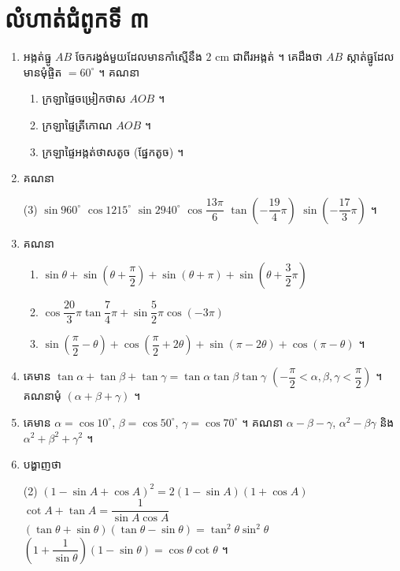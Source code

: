 \section*{លំហាត់ជំពូកទី ៣}
\begin{enumerate}[1]
  \item អង្កត់ធ្នូ $AB$ ចែករង្វង់មួយដែលមានកាំស្មើនឹង $2$ cm ជាពីរអង្កត់ ។ គេដឹងថា $AB$ ស្កាត់ធ្នូដែលមានមុំផ្ចិត $= 60^\circ$ ។ គណនា
  \begin{enumerate}[a]
    \item ក្រឡាផ្ទៃចម្រៀកថាស $AOB$ ។
    \item ក្រឡាផ្ទៃត្រីកោណ $AOB$ ។
    \item ក្រឡាផ្ទៃអង្កត់ថាសតូច (ផ្នែកតូច) ។
  \end{enumerate}
  \item គណនា
  \begin{tasks}(3)
    \task $\sin 960^\circ$
    \task $\cos 1215^\circ$
    \task $\sin 2940^\circ$
    \task $\cos\dfrac{13\pi}{6}$
    \task $\tan\left(-\dfrac{19}{4}\pi\right)$
    \task $\sin\left(-\dfrac{17}{3}\pi\right)$ ។
  \end{tasks}
  \item គណនា
  \begin{enumerate}[a]
    \item $\sin\theta + \sin\left(\theta + \dfrac{\pi}{2}\right) + \sin(\theta + \pi) + \sin\left(\theta + \dfrac{3}{2}\pi\right)$
    \item $\cos\dfrac{20}{3}\pi\tan\dfrac{7}{4}\pi + \sin\dfrac{5}{2}\pi\cos(-3\pi)$
    \item $\sin\left(\dfrac{\pi}{2} - \theta\right) + \cos\left(\dfrac{\pi}{2} + 2\theta\right) + \sin(\pi - 2\theta) + \cos(\pi - \theta)$ ។
  \end{enumerate}
  \item គេមាន $\tan\alpha + \tan\beta + \tan\gamma = \tan\alpha\tan\beta\tan\gamma$ $\left(-\dfrac{\pi}{2} < \alpha, \beta, \gamma < \dfrac{\pi}{2}\right)$ ។ គណនាមុំ $(\alpha + \beta + \gamma)$ ។
  \item គេមាន $\alpha = \cos 10^\circ$, $\beta = \cos 50^\circ$, $\gamma = \cos 70^\circ$ ។ គណនា $\alpha - \beta - \gamma$, $\alpha^2 - \beta\gamma$ និង $\alpha^2 + \beta^2 + \gamma^2$ ។
  \item បង្ហាញថា
  \begin{tasks}(2)
    \task $(1 - \sin A + \cos A)^2 = 2(1 - \sin A)(1 + \cos A)$
    \task $\cot A + \tan A = \dfrac{1}{\sin A\cos A}$
    \task $(\tan\theta + \sin\theta)(\tan\theta - \sin\theta) = \tan^2\theta\sin^2\theta$
    \task $\left(1 + \dfrac{1}{\sin\theta}\right)(1 - \sin\theta) = \cos\theta\cot\theta$ ។

\end{tasks}
\end{enumerate}
